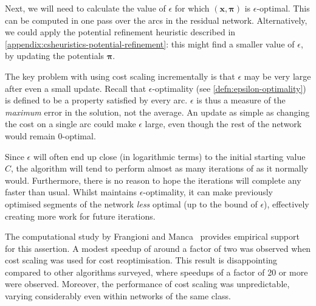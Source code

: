 Next, we will need to calculate the value of $\epsilon$ for which $\left(\mathbf{x},\boldsymbol{\pi}\right)$ is $\epsilon$-optimal. This can be computed in one pass over the arcs in the residual network\footnotemark. Alternatively, we could apply the potential refinement heuristic described in \cref{appendix:csheuristics-potential-refinement}: this might find a smaller value of $\epsilon$, by updating the potentials $\boldsymbol{\pi}$.

The key problem with using cost scaling incrementally is that $\epsilon$ may be very large after even a small update. Recall that $\epsilon$-optimality (see \cref{defn:epsilon-optimality}) is defined to be a property satisfied by every arc. $\epsilon$ is thus a measure of the \emph{maximum} error in the solution, not the average. An update as simple as changing the cost on a single arc could make $\epsilon$ large, even though the rest of the network would remain $0$-optimal.

Since $\epsilon$ will often end up close (in logarithmic terms) to the initial starting value $C$, the algorithm will tend to perform almost as many iterations of  as it normally would. Furthermore, there is no reason to hope the iterations will complete any faster than usual. Whilst  maintains $\epsilon$-optimality, it can make previously optimised segments of the network \emph{less} optimal (up to the bound of $\epsilon$), effectively creating more work for future iterations.

The computational study by Frangioni and Manca~\cite{Frangioni:2006} provides empirical support for this assertion. A modest speedup of around a factor of two was observed when cost scaling was used for cost reoptimisation. This result is disappointing compared to other algorithms surveyed, where speedups of a factor of 20 or more were observed. Moreover, the performance of cost scaling was unpredictable, varying considerably even within networks of the same class.

